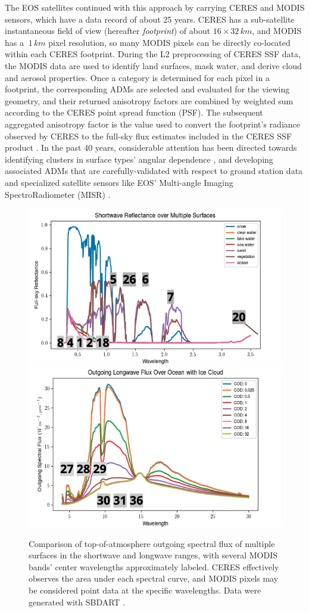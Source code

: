 \documentclass[11pt]{article}
\begin{document}
The EOS satellites continued with this approach by carrying CERES and MODIS sensors, which have a data record of about 25 years. CERES has a sub-satellite instantaneous field of view (hereafter \textit{footprint}) of about $16\times 32 \,\si{km}$, and MODIS has a $~1\,\si{km}$ pixel resolution, so many MODIS pixels can be directly co-located within each CERES footprint. During the L2 preprocessing of CERES SSF data, the MODIS data are used to identify land surfaces, mask water, and derive cloud and aerosol properties. Once a category is determined for each pixel in a footprint, the corresponding ADMs are selected and evaluated for the viewing geometry, and their returned anisotropy factors are combined by weighted sum according to the CERES point spread function (PSF). The subsequent aggregated anisotropy factor is the value used to convert the footprint's radiance observed by CERES to the full-sky flux estimates included in the CERES SSF product \cite{loeb_earths_2018}. In the past 40 years, considerable attention has been directed towards identifying clusters in surface types' angular dependence \cite{suttles_angular_1988}, and developing associated ADMs that are carefully-validated with respect to ground station data and specialized satellite sensors like EOS' Multi-angle Imaging SpectroRadiometer (MISR) \cite{loeb_defining_2002} \cite{su_next-generation_2015}.

\begin{figure}[h!]
    \centering

    \includegraphics[width=.48\linewidth]{figs/sbdart_sw.png}
    \includegraphics[width=.48\linewidth]{figs/sbdart_lw.png}

    \caption{Comparison of top-of-atmosphere outgoing spectral flux of multiple surfaces in the shortwave and longwave ranges, with several MODIS bands' center wavelengths approximately labeled. CERES effectively observes the area under each spectral curve, and MODIS pixels may be considered point data at the specific wavelengths. Data were generated with SBDART \cite{ricchiazzi_sbdart_1998}.}
    \label{ceres_modis_compare}
\end{figure}
\end{document}
